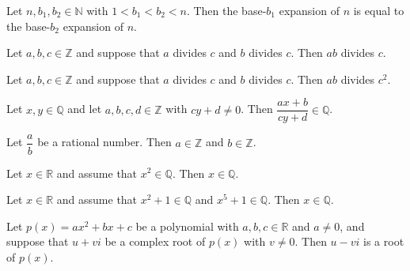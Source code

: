 \begin{chapex} %
Let $n,b_1,b_2 \in \mathbb{N}$ with $1 < b_1 < b_2 < n$. Then the base-$b_1$ expansion of $n$ is equal to the base-$b_2$ expansion of $n$.
\end{chapex}

\begin{chapex} %
Let $a,b,c \in \mathbb{Z}$ and suppose that $a$ divides $c$ and $b$ divides $c$. Then $ab$ divides $c$.
\end{chapex}

\begin{chapex} %
Let $a,b,c \in \mathbb{Z}$ and suppose that $a$ divides $c$ and $b$ divides $c$. Then $ab$ divides $c^2$.
\end{chapex}

\begin{chapex} %
Let $x,y \in \mathbb{Q}$ and let $a,b,c,d \in \mathbb{Z}$ with $cy+d \ne 0$. Then $\dfrac{ax+b}{cy+d} \in \mathbb{Q}$.
\end{chapex}

\begin{chapex} %
Let $\dfrac{a}{b}$ be a rational number. Then $a \in \mathbb{Z}$ and $b \in \mathbb{Z}$.
\end{chapex}

\begin{chapex} %
Let $x \in \mathbb{R}$ and assume that $x^2 \in \mathbb{Q}$. Then $x \in \mathbb{Q}$.
\end{chapex}

\begin{chapex} %
Let $x \in \mathbb{R}$ and assume that $x^2+1 \in \mathbb{Q}$ and $x^5+1 \in \mathbb{Q}$. Then $x \in \mathbb{Q}$.
\end{chapex}

\begin{chapex} %
\label{cqGettingStartedASNEnd}
Let $p(x) = ax^2+bx+c$ be a polynomial with $a,b,c \in \mathbb{R}$ and $a \ne 0$, and suppose that $u+vi$ be a complex root of $p(x)$ with $v \ne 0$. Then $u-vi$ is a root of $p(x)$.
\end{chapex}